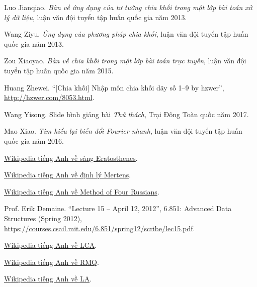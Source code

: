 \documentclass[11pt]{article}
\begin{document}
\begin{enumerate}[label={[\arabic*]}]
  \item Luo Jianqiao. \emph{Bàn về ứng dụng của tư tưởng chia khối trong một
  lớp bài toán xử lý dữ liệu}, luận văn đội tuyển tập huấn quốc gia năm 2013.

  \item Wang Ziyu. \emph{Ứng dụng của phương pháp chia khối}, luận văn đội
  tuyển tập huấn quốc gia năm 2013.

  \item Zou Xiaoyao. \emph{Bàn về chia khối trong một lớp bài toán trực
  tuyến}, luận văn đội tuyển tập huấn quốc gia năm 2015.

  \item Huang Zhewei. ``[Chia khối] Nhập môn chia khối dãy số 1--9 by
  hzwer'', \url{http://hzwer.com/8053.html}.

  \item Wang Yisong. Slide bình giảng bài \emph{Thử thách}, Trại Đông Toàn
  quốc năm 2017.

  \item Mao Xiao. \emph{Tìm hiểu lại biến đổi Fourier nhanh}, luận văn đội
  tuyển tập huấn quốc gia năm 2016.

  \item \href{https://en.wikipedia.org/wiki/Sieve_of_Eratosthenes}{Wikipedia
  tiếng Anh về sàng Eratosthenes}.

  \item \href{https://en.wikipedia.org/wiki/Mertens%27_theorems}{Wikipedia
  tiếng Anh về định lý Mertens}.

  \item \href{https://en.wikipedia.org/wiki/Method_of_Four_Russians}{Wikipedia
  tiếng Anh về Method of Four Russians}.

  \item Prof. Erik Demaine. ``Lecture 15 -- April 12, 2012'', 6.851:
  Advanced Data Structures (Spring 2012),
  \url{https://courses.csail.mit.edu/6.851/spring12/scribe/lec15.pdf}.

  \item \href{https://en.wikipedia.org/wiki/Lowest_common_ancestor}{Wikipedia
  tiếng Anh về LCA}.

  \item \href{https://en.wikipedia.org/wiki/Range_minimum_query}{Wikipedia
  tiếng Anh về RMQ}.

  \item \href{https://en.wikipedia.org/wiki/Level_ancestor_problem}{Wikipedia
  tiếng Anh về LA}.
\end{enumerate}
\end{document}
